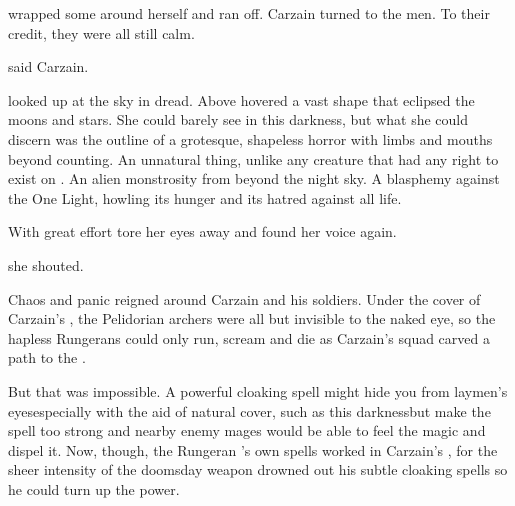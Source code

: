 \Sanyor wrapped some \Archons around herself and ran off. 
Carzain turned to the men.
To their credit, they were all still calm. 

 said Carzain.





\begin{comment}
  \subsection{\Dornaer under fire}
\end{comment}
\Dornaer looked up at the sky in dread. 
Above hovered a vast shape that eclipsed the moons and stars. 
She could barely see in this darkness, but what she could discern was the outline of a grotesque, shapeless horror with limbs and mouths beyond counting. 
An unnatural thing, unlike any creature that had any right to exist on \Miith. 
An alien monstrosity from beyond the night sky. 
A blasphemy against the One Light, howling its hunger and its hatred against all life. 

With great effort \Dornaer tore her eyes away and found her voice again. 

 she shouted. 





\begin{comment}
  \subsection{Carzain attacks}
\end{comment}
Chaos and panic reigned around Carzain and his soldiers. 
Under the cover of Carzain's \qliphoth, the Pelidorian archers were all but invisible to the naked eye, so the hapless Rungerans could only run, scream and die as Carzain's squad carved a path to the \ishrah. 

But that was impossible. 
A powerful cloaking spell might hide you from laymen's eyes\dash especially with the aid of natural cover, such as this darkness\dash but make the spell too strong and nearby enemy mages would be able to feel the magic and dispel it. 
Now, though, the Rungeran \ishrah's own spells worked in Carzain's \favour, for the sheer intensity of the doomsday weapon drowned out his subtle cloaking spells so he could turn up the power. 

